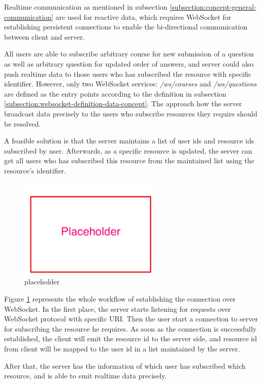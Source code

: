 
Realtime communication as mentioned in subsection \ref{subsection:concept-general-communication} are used for reactive data, which requires WebSocket for establishing persistent connections to enable the bi-directional communication between client and server.


All users are able to subscribe arbitrary course for new submission of a question as well as arbitrary question for updated order of answers, and server could also push realtime data to those users who has subscribed the resource with specific identifier. However, only two WebSocket services: \textit{/ws/courses} and \textit{/ws/questions} are defined as the entry points according to the definition in subsection \ref{subsection:websocket-definition-data-concept}. The approach how the server broadcast data precisely to the users who subscribe resources they require should be resolved.

A feasible solution is that the server maintains a list of user ids and resource ids subscribed by user. Afterwards, as a specific resource is updated, the server can get all users who has subscribed this resource from the maintained list using the resource's identifier.

\begin{figure}[!htbp]
  \centering
    \includegraphics[width=0.6\textwidth]{Figures/placeholder.png}
  \caption{placeholder}
  \label{fig:websocket-connection-sequence-concept}
\end{figure}


Figure \ref{fig:websocket-connection-sequence-concept} represents the whole workflow of establishing the connection over WebSocket. In the first place, the server starts listening for requests over WebSocket protocol with specific URI. Then the user start a connection to server for subscribing the resource he requires. As soon as the connection is successfully established, the client will emit the resource id to the server side, and resource id from client will be mapped to the user id in a list maintained by the server.

After that, the server has the information of which user has subscribed which resource, and is able to emit realtime data precisely.